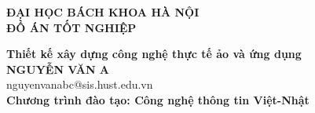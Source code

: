 \documentclass[DoAn.tex]{subfiles}
\begin{document}
\begin{titlepage}
\thispagestyle{empty}
\begin{center}

{\textbf{\large{ĐẠI HỌC BÁCH KHOA HÀ NỘI}}}\\[4cm]

{\textbf{\huge{ ĐỒ ÁN TỐT NGHIỆP}}}\\[1cm]
{\textbf{\Large{Thiết kế xây dựng công nghệ thực tế ảo và ứng dụng}}\\[1cm]

{\textbf{\large{NGUYỄN VĂN A}}}\\
{\large{nguyenvanabc@sis.hust.edu.vn}}\\[0.5cm]

{\textbf{\large{Chương trình đào tạo: Công nghệ thông tin Việt-Nhật
}}}\\

\vspace{4cm}
\begin{table}[H]
\centering
{}
\end{table}}
\end{center}



\end{titlepage}
\end{document}
